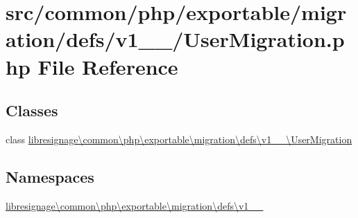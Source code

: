 \hypertarget{v1__1__0_2UserMigration_8php}{}\section{src/common/php/exportable/migration/defs/v1\+\_\+\_/\+User\+Migration.php File Reference}
\label{v1__1__0_2UserMigration_8php}
\subsection*{Classes}
\begin{DoxyCompactItemize}
\item 
class \hyperlink{classlibresignage_1_1common_1_1php_1_1exportable_1_1migration_1_1defs_1_1v1__1__0_1_1UserMigration}{libresignage\textbackslash{}common\textbackslash{}php\textbackslash{}exportable\textbackslash{}migration\textbackslash{}defs\textbackslash{}v1\+\_\+\_\textbackslash{}\+User\+Migration}
\end{DoxyCompactItemize}
\subsection*{Namespaces}
\begin{DoxyCompactItemize}
\item 
 \hyperlink{namespacelibresignage_1_1common_1_1php_1_1exportable_1_1migration_1_1defs_1_1v1__1__0}{libresignage\textbackslash{}common\textbackslash{}php\textbackslash{}exportable\textbackslash{}migration\textbackslash{}defs\textbackslash{}v1\+\_\+\_}
\end{DoxyCompactItemize}
